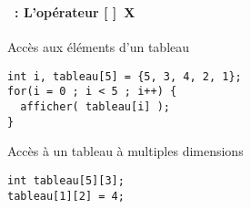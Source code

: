 \begin{frame}[containsverbatim]
  \frametitle{\secname}
  \framesubtitle{\subsecname~: L'opérateur [ ]~X}

  \begin{exampleblock}{Accès aux éléments d'un tableau}
    \begin{verbatim}
int i, tableau[5] = {5, 3, 4, 2, 1};
for(i = 0 ; i < 5 ; i++) {
  afficher( tableau[i] );
}\end{verbatim}
  \end{exampleblock}
  \vspace{0.5cm}
  \begin{exampleblock}{Accès à un tableau à multiples dimensions}
    \begin{verbatim}
int tableau[5][3];
tableau[1][2] = 4;\end{verbatim}
  \end{exampleblock}
\end{frame}

